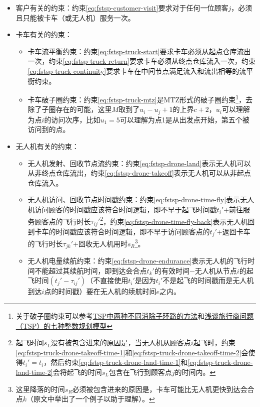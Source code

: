 \begin{itemize}
    \item \colorbox{shallow-green}{客户有关的约束：}约束\ref{eq:fstsp-customer-visit}要求对于任何一位顾客$j$，必须且只能被卡车（或无人机）服务一次。
    \item \colorbox{shallow-purple}{卡车有关的约束：}
    \begin{itemize}
        \item 卡车流平衡约束：约束\ref{eq:fstsp-truck-start}要求卡车必须从起点仓库流出一次，约束\ref{eq:fstsp-truck-return}要求卡车必须从终点仓库流入一次，约束\ref{eq:fstsp-truck-continuity}要求卡车在中间节点满足流入和流出相等的流平衡约束。
        \item 卡车破子圈约束：约束\ref{eq:fstsp-truck-mtz}是MTZ形式的破子圈约束\footnote{关于破子圈约束可以参考\href{https://mp.weixin.qq.com/s/i7I-o0LiC_JP3vVOQw2AIw}{TSP中两种不同消除子环路的方法}和\href{https://mp.weixin.qq.com/s/tDYOxlSQHKRJkf5EcaBJ1A}{浅谈旅行商问题（TSP）的七种整数规划模型}}，去除了子圈存在的可能，这里$M$取到了$u_i - u_j + 1$的上界$c+2$，$u_i$可以理解为点$i$的访问次序，比如$u_1 = 5$可以理解为点1是从出发点开始，第五个被访问到的点。
    \end{itemize}
    \item \colorbox{shallow-red}{无人机有关的约束：}
    \begin{itemize}
        \item 无人机发射、回收节点流约束：约束\ref{eq:fstsp-drone-land}表示无人机可以从非终点仓库流出，约束\ref{eq:fstsp-drone-takeoff}表示无人机可以从非起点仓库流入。
        \item 无人机访问、回收节点时间戳约束：约束\ref{eq:fstsp-drone-time-fly}表示无人机访问顾客的时间戳应该符合时间逻辑，即不早于起飞时间戳$t_i'$+前往服务顾客点的飞行时长$\tau_{ij}'$\footnote{起飞时间$s_L$没有被包含进来的原因是，当无人机从顾客点$i$起飞时，约束\ref{eq:fstsp-truck-drone-takeoff-time-1}和\ref{eq:fstsp-truck-drone-takeoff-time-2}会使得$t_i' = t_i$，然后约束\ref{eq:fstsp-truck-drone-land-time-1}和\ref{eq:fstsp-truck-drone-land-time-2}会将起飞的时间$s_L$包含在飞行到顾客点$j$的时间内。}，约束\ref{eq:fstsp-drone-time-fly-back}表示无人机回到卡车的时间戳应该符合时间逻辑，即不早于访问顾客点的$t_j'$+返回卡车的飞行时长$\tau_{jk}'$+回收无人机用时$s_R$\footnote{这里降落的时间$s_R$必须被包含进来的原因是，卡车可能比无人机更快到达会合点$k$（原文中举出了一个例子以助于理解\cite{murrayFlyingSidekickTraveling2015}）。}。
        \item 无人机电量续航约束：约束\ref{eq:fstsp-drone-endurance}表示无人机的飞行时间不能超过其续航时间，即到达会合点$t_k'$的有效时间$-$无人机从节点$i$的起飞时间$(t_j'-\tau_{ij}')$（不直接使用$t_i'$是因为$t_i'$不是起飞的时间戳而是无人机到达$i$点的时间戳）要在无人机的续航时间$e$之内。

\end{itemize}
\end{itemize}
